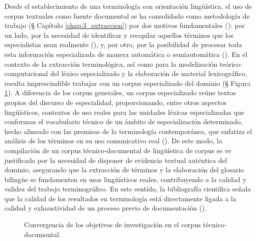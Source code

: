 Desde el establecimiento de una terminología con orientación lingüística, el uso de corpus textuales como fuente documental se ha consolidado como metodología de trabajo (§ Capítulo \ref{chap:3_extraccion}) por dos motivos fundamentales (\cite{duran2011trabajo}): por un lado, por la necesidad de identificar y recopilar aquellos términos que los especialistas usan realmente (\cite{cabre1999terminology}), y, por otro, por la posibilidad de procesar toda esta información especializada de manera automática o semiautomática (\cite{duran2011trabajo}). En el contexto de la extracción terminológica, así como para la modelización teórico-computacional del léxico especializado y la elaboración de material lexicográfico, resulta imprescindible trabajar con un corpus especializado del dominio (§ Figura \ref{fig:objetivos-corpus}). A diferencia de los corpus generales, un corpus especializado reúne textos propios del discurso de especialidad, proporcionando, entre otros aspectos lingüísticos, contextos de uso reales para las unidades léxicas especializadas que conforman el vocabulario técnico de un ámbito de especialización determinado, hecho alineado con las premisas de la terminología contemporánea, que enfatiza el análisis de los términos en su uso comunicativo real (\cite{cabre1999terminology}). De este modo, la compilación de un corpus técnico-documental de lingüística de corpus se ve justificada por la necesidad de disponer de evidencia textual auténtica del dominio, asegurando que la extracción de términos y la elaboración del glosario bilingüe se fundamenten en usos lingüísticos reales, contribuyendo a la calidad y validez del trabajo terminográfico. En este sentido, la bibliografía científica señala que la calidad de los resultados en terminología está directamente ligada a la calidad y exhaustividad de un proceso previo de documentación (\cite{picht1985terminology, rondeau1984,bowker1996towards, meyer1996corpus, vargas2005aproximacion}).

\begin{figure}[H]
\centering
{}
\caption{Convergencia de los objetivos de investigación en el corpus técnico-documental.}
\label{fig:objetivos-corpus}
\end{figure}

